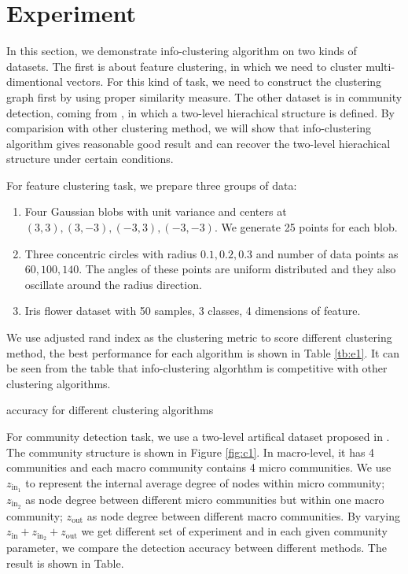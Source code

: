 \documentclass{article}
\begin{document}
\section{Experiment}\label{sec:experiment}
In this section, we demonstrate info-clustering algorithm on two kinds of datasets. The first is about feature clustering, in which we need to cluster multi-dimentional vectors. For this kind of task, we need to construct the clustering graph first by using proper similarity measure. The other dataset is in community detection, coming from \cite{RN22}, in which a two-level hierachical structure is defined. By comparision with other clustering method, we will show that info-clustering algorithm gives reasonable good result and can recover the two-level hierachical structure under certain conditions. 

For feature clustering task, we prepare three groups of data:
\begin{enumerate}
\item Four Gaussian blobs with unit variance and centers at $(3,3), (3,-3), (-3,3), (-3,-3)$.  We generate 25 points for each blob.
\item Three concentric circles with radius $0.1,0.2,0.3$ and number of data points as $60, 100, 140$. The angles of these points are uniform distributed and they also oscillate around the radius direction.
\item Iris flower dataset with 50 samples, 3 classes, 4 dimensions of feature.
\end{enumerate}
We use adjusted rand index as the clustering metric to score different clustering method, the best performance for each algorithm is shown in Table \ref{tb:e1}.  It can be seen from the table that info-clustering algorhthm is competitive with other clustering algorithms.
\begin{table}
\centering
{}
\caption{ accuracy for different clustering algorithms }\label{tb:e1}
\end{table}

For community detection task, we use a two-level artifical dataset proposed in \cite{RN22}. 
The community structure is shown in Figure \ref{fig:c1}. In macro-level, it has 4 communities and each macro community contains 4 micro communities. We use $z_{\mathrm{in}_1}$ to represent the internal average degree of nodes within micro community; $z_{\mathrm{in}_2}$ as node degree between different micro communities but within one macro community; $z_{\mathrm{out}}$ as node degree between different macro communities. By varying $z_{\mathrm{in}} + z_{\mathrm{in}_2} + z_{\mathrm{out}}$ we get different set of experiment and in each given community parameter, we compare the detection accuracy between different methods. The result is shown in Table.
\end{document}
